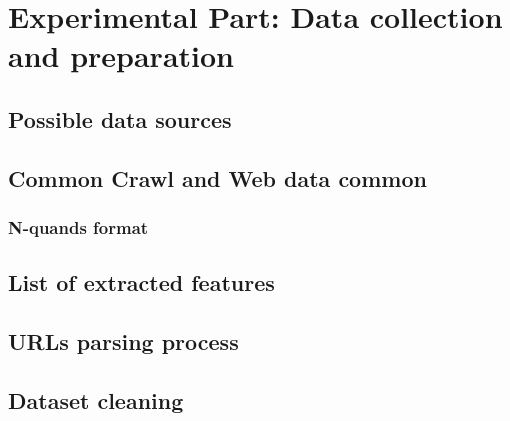 \chapter{Experimental Part: Data collection and preparation}
\section{Possible data sources}
\section{Common Crawl and Web data common}
\subsection{N-quands format}
\section{List of extracted features}
\section{URLs parsing process}
\section{Dataset cleaning}